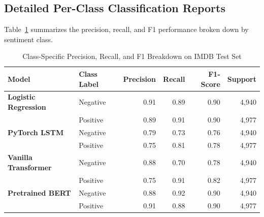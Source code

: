 \subsection{Detailed Per-Class Classification Reports}
Table~\ref{tab:exp7_class_reports} summarizes the precision, recall, and F1 performance broken down by sentiment class.
\begin{table}[H]
\centering
\small
\caption{Class-Specific Precision, Recall, and F1 Breakdown on IMDB Test Set}
\label{tab:exp7_class_reports}
\begin{tabular}{llrrrr}
\toprule
\textbf{Model} & \textbf{Class Label} & \textbf{Precision} & \textbf{Recall} & \textbf{F1-Score} & \textbf{Support} \\
\midrule
\textbf{Logistic Regression} & Negative & 0.91 & 0.89 & 0.90 & 4,940 \\
                             & Positive & 0.89 & 0.91 & 0.90 & 4,977 \\
\midrule
\textbf{PyTorch LSTM}        & Negative & 0.79 & 0.73 & 0.76 & 4,940 \\
                             & Positive & 0.75 & 0.81 & 0.78 & 4,977 \\
\midrule
\textbf{Vanilla Transformer} & Negative & 0.88 & 0.70 & 0.78 & 4,940 \\
                             & Positive & 0.75 & 0.91 & 0.82 & 4,977 \\
\midrule
\textbf{Pretrained BERT}     & Negative & 0.88 & 0.92 & 0.90 & 4,940 \\
                             & Positive & 0.91 & 0.88 & 0.90 & 4,977 \\
\bottomrule
\end{tabular}
\end{table}

